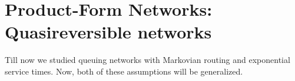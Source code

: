 \documentclass[all-lectures.tex]{subfiles}
\begin{document}

\setcounter{section}{3}
\setcounter{subsection}{0}

\section*{}
\section{Product-Form Networks: Quasireversible networks}
Till now we studied queuing networks with Markovian routing and exponential service times.  Now, both of these assumptions will be generalized. 
\end{document}
